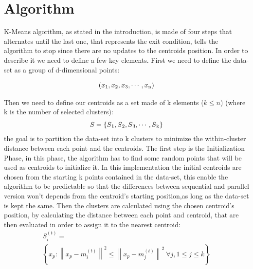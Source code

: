 \documentclass[10pt,twocolumn,letterpaper]{article}
\begin{document}
\vspace{3cm}

\section{Algorithm}

K-Means algorithm, as stated in the introduction, is made of four steps that alternates until the last one, that represents 
the exit condition, tells the algorithm to stop since there are no updates to the centroids position.\newline
In order to describe it we need to define a few key elements.\newline
First we need to define the data-set as a group of d-dimensional points:\newline

\begin{equation} 
\label{eq:Data-Set}
(x\textsubscript{1},x\textsubscript{2},x\textsubscript{3},\cdots,x\textsubscript{n})
\end{equation}

Then we need to define our centroids as a set made of k elements ($k \leq n$) (where k is the number of selected clusters):\newline
\begin{equation} 
\label{eq:Data-Set}
S=\{S\textsubscript{1},S\textsubscript{2},S\textsubscript{3},\cdots,S\textsubscript{k}\}
\end{equation}
the goal is to partition the data-set into k clusters to minimize the within-cluster distance between each point and the centroids.
\newline
The first step is the Initialization Phase, in this phase, the algorithm has to find some random points that will be used as 
centroids to initialize it.\newline
In this implementation the initial centroids are chosen from the starting k points contained in the data-set, this enable the 
algorithm to be predictable so that the differences between sequential and parallel version won't depends from the centroid's 
starting position,as long as the data-set is kept the same.
\newline
Then the clusters are calculated using the chosen centroid's position, by calculating the distance between each point and 
centroid, that are then evaluated in order to assign it to the nearest centroid:\newline
\begin{multline}
\label{eq:Centroids}
S_i^{(t)} =\\
\left \{ x_p : \left \| x_p - m^{(t)}_i \right \|^2 \le \left \| x_p - m^{(t)}_j \right \|^2 \ \forall j, 1 \le j \le k \right\}\\
\end{multline}
\end{document}
